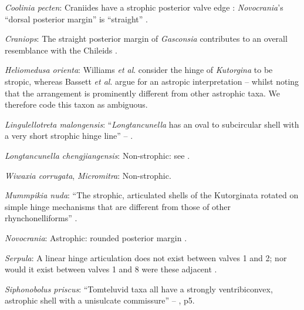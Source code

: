 \documentclass[openany]{book}
\theoremstyle{definition}
\theoremstyle{definition}
\theoremstyle{definition}
\theoremstyle{remark}
\begin{document}
\hypertarget{Coolinia_pecten-coding-65}{}
\emph{Coolinia pecten}: Craniides have a strophic posterior valve edge
\citep[table 39 on p.~2853]{Williams2007Supplement}: \emph{Novocrania}'s
``dorsal posterior margin'' is ``straight''
\citep[p.~171]{Williams2000LinguliformeaCraniiformea}.

\hypertarget{Craniops-coding-65}{}
\emph{Craniops}: The straight posterior margin of \emph{Gasconsia}
contributes to an overall resemblance with the Chileids
\citep{Holmer2014Ordovician96}.

\hypertarget{Heliomedusa_orienta-coding-65}{}
\emph{Heliomedusa orienta}: Williams \emph{et al}.
\citeyearpar[p.~208]{Williams2000LinguliformeaCraniiformea} consider the
hinge of \emph{Kutorgina} to be stropic, whereas Bassett \emph{et al}.
\citeyearpar{Bassett2001Functionalmorphology} argue for an astropic
interpretation -- whilst noting that the arrangement is prominently
different from other astrophic taxa. We therefore code this taxon as
ambiguous.

\hypertarget{Lingulellotreta_malongensis-coding-65}{}
\emph{Lingulellotreta malongensis}: ``\emph{Longtancunella} has an oval
to subcircular shell with a very short strophic hinge line'' --
\citet{Zhang2011Theexceptionally}.

\hypertarget{Longtancunella_chengjiangensis-coding-65}{}
\emph{Longtancunella chengjiangensis}: Non-strophic: see
\citet{Holmer2008TheEarly}.

\hypertarget{Micromitra-coding-65}{}
\emph{Wiwaxia corrugata}, \emph{Micromitra}: Non-strophic.

\hypertarget{Mummpikia_nuda-coding-65}{}
\emph{Mummpikia nuda}: ``The strophic, articulated shells of the
Kutorginata rotated on simple hinge mechanisms that are different from
those of other rhynchonelliforms''
\citep[p.~208]{Williams2000LinguliformeaCraniiformea}.

\hypertarget{Novocrania-coding-65}{}
\emph{Novocrania}: Astrophic: rounded posterior margin \citep[see fig.
91 in][]{Williams2000LinguliformeaCraniiformea}.

\hypertarget{Serpula-coding-65}{}
\emph{Serpula}: A linear hinge articulation does not exist between
valves 1 and 2; nor would it exist between valves 1 and 8 were these
adjacent \citep{Connors2012}.

\hypertarget{Siphonobolus_priscus-coding-65}{}
\emph{Siphonobolus priscus}: ``Tomteluvid taxa all have a strongly
ventribiconvex, astrophic shell with a unisulcate commissure'' --
\citet{Streng2016Anew}, p5.
\end{document}
